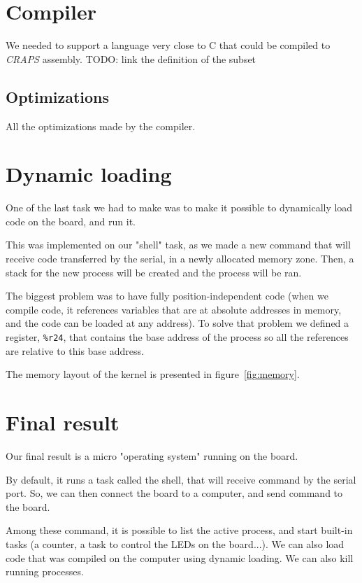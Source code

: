 \documentclass[openany, a4paper]{book}
\begin{document}
    \section{Compiler}
      We needed to support a language very close to C that could be compiled to
      \emph{CRAPS} assembly.
      TODO: link the definition of the subset

      \subsection{Optimizations}
        All the optimizations made by the compiler.

    \section{Dynamic loading}
      One of the last task we had to make was to make it possible to
      dynamically load code on the board, and run it.

      This was implemented on our "shell" task, as we made a new command that
      will receive code transferred by the serial, in a newly allocated
      memory zone.  Then, a stack for the new process will be created and the
      process will be ran.

      The biggest problem was to have fully position-independent code (when
      we compile code, it references variables that are at absolute addresses
      in memory, and the code can be loaded at any address). To solve that
      problem we defined a register, \verb+%r24+, that contains the base
      address of the process so all the references are relative to this base
      address.

      The memory layout of the kernel is presented in figure~\ref{fig:memory}.

    \section{Final result}
      Our final result is a micro "operating system" running on the board.

      By default, it runs a task called the shell, that will receive command by
      the serial port.  So, we can then connect the board to a computer, and
      send command to the board.

      Among these command, it is possible to list the active process, and start
      built-in tasks (a counter, a task to control the LEDs on the board...).
      We can also load code that was compiled on the computer using dynamic
      loading. We can also kill running processes.
\end{document}
